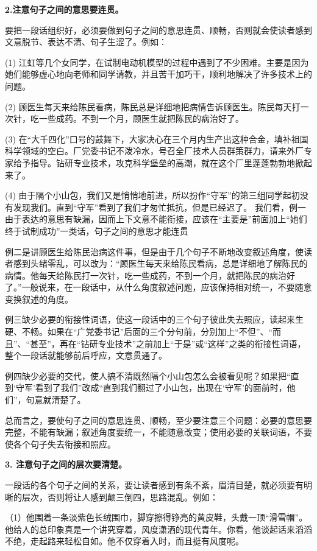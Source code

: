 \textbf{2.注意句子之间的意思要连贯。}

要把一段话组织好，必须要做到句子之间的意思连贯、顺畅，否则就会使读者感到文意脱节、表达不清、句子生涩了。例如：

(1) 江虹等几个女同学，在试制电动机模型的过程中遇到了不少困难。主要是因为她们能够虚心地向老师和同学请教，并且苦干加巧干，顺利地解决了许多技术上的问题。

(2) 顾医生每天来给陈民看病，陈民总是详细地把病情告诉顾医生。陈民每天打一次针，吃一些成药。不到一个月，顾医生就把陈民的病治好了。

(3) 在“大千四化”口号的鼓舞下，大家决心在三个月内生产出这种合金，填补祖国科学领域的空白。厂党委书记不泼冷水，号召全厂技术人员群策群力，请来外厂专家给予指导。钻研专业技术，攻克科学堡垒的高潮，就在这个厂里蓬蓬勃勃地掀起来了。

(4) 由于隔个小山包，我们又是悄悄地前进，所以扮作“守军”的第三组同学起初没有发现我们。直到“守军”看到了我们才匆忙抵抗，但是已经迟了。
我们看，例一由于表达的意思有缺漏，因而上下文意不能衔接，应该在“主要是”前面加上“她们终于试制成功”一类话，句子之间的意思才能连贯
\newpage

例二是讲顾医生给陈民治病这件事，但是由于几个句子不断地改变叙述角度，使读者感到头绪零乱，可以改为：“顾医生每天来给陈民看病，总是详细地了解陈民的病情。他每天给陈民打一次针，吃一些成药，不到一个月，就把陈民的病治好了。”一般说来，在一段话中，从什么角度叙述问题，应该保持相对统一，不要随意变换叙述的角度。

例三缺少必要的衔接性词语，使这一段话中的三个句子彼此失去照应，读起来生硬、不畅。如果在“广党委书记”后面的三个分句前，分别加上“不但”、“而且”、“甚至”，再在“钻研专业技术”之前加上“于是”或“这样”之类的衔接性词语，整个一段话就能够前后呼应，文意贯通了。

例四缺少必要的交代，使人搞不清既然隔个小山包怎么会被看见呢？如果把“直到‘守军’看到了我们”改成“直到我们翻过了小山包，出现在‘守军’的面前时，他们”，句意就清楚了。

总而言之，要使句子之间的意思连贯、顺畅，至少要注意三个问题：必要的意思要完整，不能有缺漏；叙述角度要统一，不能随意改变；使用必要的关联词语，不要使各个句子失去衔接和照应。

\textbf{3. 注意句子之间的层次要清楚。}

一段话的各个句子之间的关系，要让读者感到有条不紊，眉清目楚，就必须要有明晰的层次，否则将让人感到颠三倒四，思路混乱。例如：

（1）他围着一条淡紫色长绒围巾，脚穿擦得铮亮的黄皮鞋，头戴一顶“滑雪帽”。他给人的总印象真是一个讲究穿着，风度潇洒的现代青年。你看，他谈起话来滔滔不绝，走起路来轻松自如。他不仅穿着入时，而且挺有风度呢。

